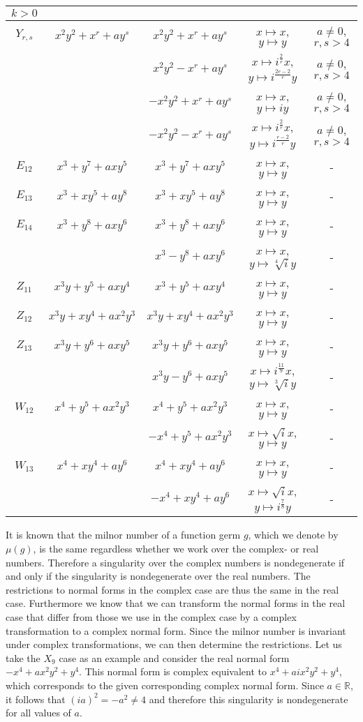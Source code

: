 \documentclass[noend]{amsproc}
\theoremstyle{definition}
\begin{document}
\begin{table}[!hbp]
\begin{tabular}{|c|c|c|c|c|}
$k>0$\\
\hline
$Y_{r,s}$&$x^2y^2+x^r+ay^s$&$x^2y^2+x^r+ay^s$&$x\mapsto x$, $y\mapsto y$
&$a\neq 0$, $r,s>4$\\
&&$x^2y^2-x^r+ay^s$&$x\mapsto i^{\frac{2}{r}}x$, $y\mapsto i^{\frac{2r-2}{r}}y$
&$a\neq 0$, $r,s>4$\\
&&$-x^2y^2+x^r+ay^s$&$x\mapsto x$, $y\mapsto iy$&$a\neq 0$, $r,s>4$\\
&&$-x^2y^2-x^r+ay^s$&$x\mapsto i^{\frac{2}{r}}x$, $y\mapsto i^{\frac{r-2}{r}}y$
&$a\neq 0$, $r,s>4$\\
\hline
$E_{12}$&$x^3+y^7+axy^5$&$x^3+y^7+axy^5$&$x\mapsto x$, $y\mapsto y$&-\\
\hline
$E_{13}$&$x^3+xy^5+ay^8$&$x^3+xy^5+ay^8$&$x\mapsto x$, $y\mapsto y$&-\\
\hline
$E_{14}$&$x^3+y^8+axy^6$&$x^3+y^8+axy^6$&$x\mapsto x$, $y\mapsto y$&-\\
&&$x^3-y^8+axy^6$&$x\mapsto x$, $y\mapsto \sqrt[4]iy$&-\\
\hline
$Z_{11}$&$x^3y+y^5+axy^4$&$x^3+y^5+axy^4$&$x\mapsto x$, $y\mapsto y$&-\\
\hline
$Z_{12}$&$x^3y+xy^4+ax^2y^3$&$x^3y+xy^4+ax^2y^3$&$x\mapsto x$, $y\mapsto y$&-\\
\hline
$Z_{13}$&$x^3y+y^6+axy^5$&$x^3y+y^6+axy^5$&$x\mapsto x$, $y\mapsto y$& -\\
&&$x^3y-y^6+axy^5$&$x\mapsto i^{\frac{11}{9}}x$, $y\mapsto \sqrt[3]i y$& -\\
\hline
$W_{12}$&$x^4+y^5+ax^2y^3$&$x^4+y^5+ax^2y^3$&$x\mapsto x$, $y\mapsto y$&-\\
&&$-x^4+y^5+ax^2y^3$&$x\mapsto\sqrt{i} x$, $y\mapsto y$&-\\
\hline
$W_{13}$&$x^4+xy^4+ay^6$&$x^4+xy^4+ay^6$&$x\mapsto x$, $y\mapsto y$&-\\
&&$-x^4+xy^4+ay^6$&$x\mapsto \sqrt{i}x$, $y\mapsto i^{\frac{7}{8}}y$&-\\
\hline
\end{tabular}
\end{table}

It is known that the milnor number of a function germ $g$, which we denote by
$\mu(g)$, is the same regardless whether we work over the complex- or real
numbers. Therefore a singularity over the complex numbers is nondegenerate if
and only if the singularity is nondegenerate over the real numbers. The
restrictions to normal forms in the complex case are thus the same in the real
case. Furthermore we know that we can transform the normal forms in the real
case that differ from those we use in the complex case by a complex
transformation to a complex normal form. Since the milnor number is invariant
under complex transformations, we can then determine the restrictions. Let us
take the $X_9$ case as an example and consider the real normal form
$-x^4+ax^2y^2+y^4$. This normal form is complex equivalent to
$x^4+aix^2y^2+y^4$, which corresponds to the given corresponding complex normal
form. Since $a\in\mathbb R$, it follows that $(ia)^2=-a^2\neq4$ and therefore
this singularity is nondegenerate for all values of $a$.
\end{document}
